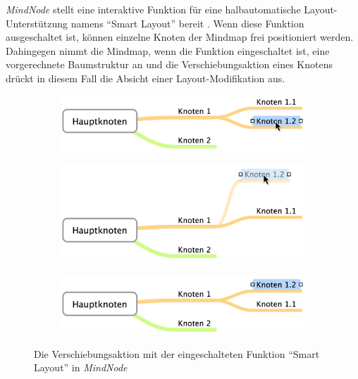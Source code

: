 \textit{MindNode} stellt eine interaktive Funktion für eine halbautomatische Layout-Unterstützung namens \enquote{Smart Layout} bereit \cite{14MindNode}. Wenn diese Funktion ausgeschaltet ist, können einzelne Knoten der Mindmap frei positioniert werden. Dahingegen nimmt die Mindmap, wenn die Funktion eingeschaltet ist, eine vorgerechnete Baumstruktur an und die Verschiebungsaktion eines Knotens drückt in diesem Fall die Absicht einer Layout-Modifikation aus.

\begin{figure}[hbt]
    \newcommand{\subfigurewidth}{\textwidth}
    \newcommand{\graphicsscale}{0.25}
    \begin{subfigure}{\subfigurewidth}
        \centering
        \includegraphics[scale=\graphicsscale]{assets/mindnode-smart-layout-a}
        \caption{}
        \label{fig:mindnode-smart-layout-a}
    \end{subfigure}
    \begin{subfigure}{\subfigurewidth}
        \centering
        \includegraphics[scale=\graphicsscale]{assets/mindnode-smart-layout-b}
        \caption{}
        \label{fig:mindnode-smart-layout-b}
    \end{subfigure}
    \begin{subfigure}{\subfigurewidth}
        \centering
        \includegraphics[scale=\graphicsscale]{assets/mindnode-smart-layout-c}
        \caption{}
        \label{fig:mindnode-smart-layout-c}
    \end{subfigure}
    \caption{Die Verschiebungsaktion mit der eingeschalteten Funktion \enquote{Smart Layout} in \textit{MindNode}}
    \label{fig:mindnode-smart-layout}
\end{figure}


